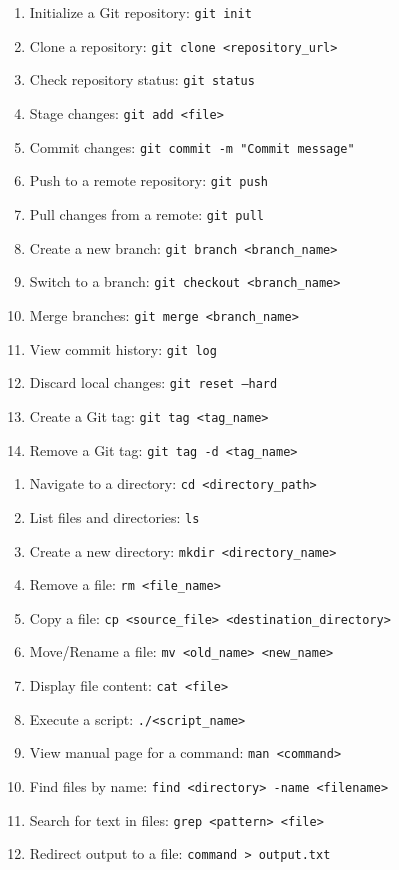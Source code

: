 \documentclass[9pt]{cheatsheet}
\begin{document}
\begin{multicols*}{3}


\begin{enumerate}
  \item Initialize a Git repository: \texttt{git init}
  \item Clone a repository: \texttt{git clone <repository\_url>}
  \item Check repository status: \texttt{git status}
  \item Stage changes: \texttt{git add <file>}
  \item Commit changes: \texttt{git commit -m "Commit message"}
  \item Push to a remote repository: \texttt{git push}
  \item Pull changes from a remote: \texttt{git pull}
  \item Create a new branch: \texttt{git branch <branch\_name>}
  \item Switch to a branch: \texttt{git checkout <branch\_name>}
  \item Merge branches: \texttt{git merge <branch\_name>}
  \item View commit history: \texttt{git log}
  \item Discard local changes: \texttt{git reset --hard}
  \item Create a Git tag: \texttt{git tag <tag\_name>}
  \item Remove a Git tag: \texttt{git tag -d <tag\_name>}
\end{enumerate}


\begin{enumerate}
  \item Navigate to a directory: \texttt{cd <directory\_path>}
  \item List files and directories: \texttt{ls}
  \item Create a new directory: \texttt{mkdir <directory\_name>}
  \item Remove a file: \texttt{rm <file\_name>}
  \item Copy a file: \texttt{cp <source\_file> <destination\_directory>}
  \item Move/Rename a file: \texttt{mv <old\_name> <new\_name>}
  \item Display file content: \texttt{cat <file>}
  \item Execute a script: \texttt{./<script\_name>}
  \item View manual page for a command: \texttt{man <command>}
  \item Find files by name: \texttt{find <directory> -name <filename>}
  \item Search for text in files: \texttt{grep <pattern> <file>}
  \item Redirect output to a file: \texttt{command > output.txt}
\end{enumerate}


\end{multicols*}
\end{document}
